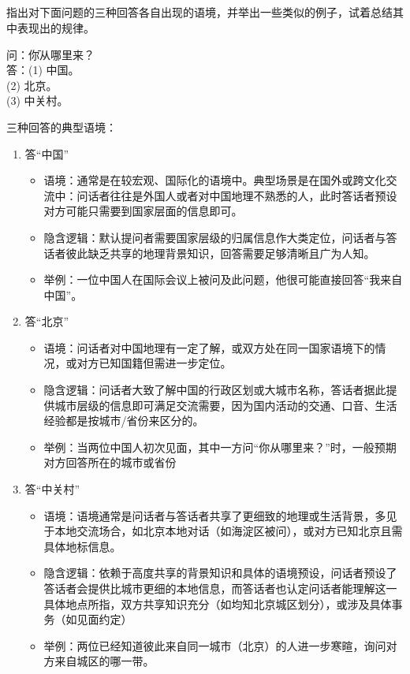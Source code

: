 \documentclass[10pt]{ctexart}
\begin{document}
\subsection{}
{\heiti
指出对下面问题的三种回答各自出现的语境，并举出一些类似的例子，试着总结其中表现出的规律。}
{\kaishu
\begin{tabbing}
    \hspace{1cm}
    问：\=你从哪里来？\\[0.5em]
    \hspace{1cm}
    答：\>(1) 中国。\\[0.5em]
    \>(2) 北京。\\[0.5em] 
    \>(3) 中关村。\\
\end{tabbing}
}


三种回答的典型语境：
\begin{enumerate}
    \item 答``中国''
    \begin{itemize}
        \item 语境：通常是在较宏观、国际化的语境中。典型场景是在国外或跨文化交流中：问话者往往是外国人或者对中国地理不熟悉的人，此时答话者预设对方可能只需要到国家层面的信息即可。
        \item 隐含逻辑：默认提问者需要国家层级的归属信息作大类定位，问话者与答话者彼此缺乏共享的地理背景知识，回答需要足够清晰且广为人知。
        \item 举例：一位中国人在国际会议上被问及此问题，他很可能直接回答``我来自中国''。
    \end{itemize}

    \item 答``北京''
    \begin{itemize}
        \item 语境：问话者对中国地理有一定了解，或双方处在同一国家语境下的情况，或对方已知国籍但需进一步定位。
        \item 隐含逻辑：问话者大致了解中国的行政区划或大城市名称，答话者据此提供城市层级的信息即可满足交流需要，因为国内活动的交通、口音、生活经验都是按城市/省份来区分的。
        \item 举例：当两位中国人初次见面，其中一方问``你从哪里来？''时，一般预期对方回答所在的城市或省份
    \end{itemize}

    \item 答``中关村''
    \begin{itemize}
        \item 语境：语境通常是问话者与答话者共享了更细致的地理或生活背景，多见于本地交流场合，如北京本地对话（如海淀区被问），或对方已知北京且需具体地标信息。
        \item 隐含逻辑：依赖于高度共享的背景知识和具体的语境预设，问话者预设了答话者会提供比城市更细的本地信息，而答话者也认定问话者能理解这一具体地点所指，双方共享知识充分（如均知北京城区划分），或涉及具体事务（如见面约定）
        \item 举例：两位已经知道彼此来自同一城市（北京）的人进一步寒暄，询问对方来自城区的哪一带。
    \end{itemize}
\end{enumerate}
\end{document}
